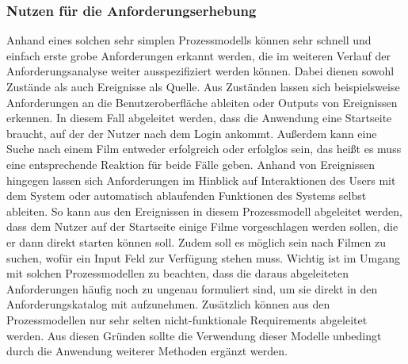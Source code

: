 \subsubsection{Nutzen für die Anforderungserhebung}\label{subsubsec:nutzen}
Anhand eines solchen sehr simplen Prozessmodells können sehr schnell und einfach erste grobe Anforderungen erkannt werden,
die im weiteren Verlauf der Anforderungsanalyse weiter ausspezifiziert werden können.
Dabei dienen sowohl Zustände als auch Ereignisse als Quelle.
Aus Zuständen lassen sich beispielsweise Anforderungen an die Benutzeroberfläche ableiten oder Outputs von Ereignissen
erkennen.
In diesem Fall abgeleitet werden, dass die Anwendung eine Startseite braucht, auf der der Nutzer nach dem Login ankommt.
Außerdem kann eine Suche nach einem Film entweder erfolgreich oder erfolglos sein, das heißt es muss eine entsprechende
Reaktion für beide Fälle geben.
Anhand von Ereignissen hingegen lassen sich Anforderungen im Hinblick auf Interaktionen des Users mit dem System oder
automatisch ablaufenden Funktionen des Systems selbst ableiten.
So kann aus den Ereignissen in diesem Prozessmodell abgeleitet werden, dass dem Nutzer auf der Startseite einige Filme
vorgeschlagen werden sollen, die er dann direkt starten können soll.
Zudem soll es möglich sein nach Filmen zu suchen, wofür ein Input Feld zur Verfügung stehen muss.
Wichtig ist im Umgang mit solchen Prozessmodellen zu beachten, dass die daraus abgeleiteten Anforderungen häufig noch zu
ungenau formuliert sind, um sie direkt in den Anforderungskatalog mit aufzunehmen.
Zusätzlich können aus den Prozessmodellen nur sehr selten nicht-funktionale Requirements abgeleitet werden.
Aus diesen Gründen sollte die Verwendung dieser Modelle unbedingt durch die Anwendung weiterer Methoden ergänzt werden.